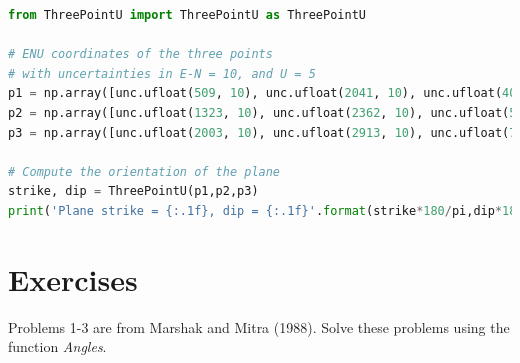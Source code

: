 \documentclass[a4paper , 12pt]{book}
\begin{document}
\begin{center}
\begin{lstlisting}[language=Python, frame=single]
from ThreePointU import ThreePointU as ThreePointU

# ENU coordinates of the three points
# with uncertainties in E-N = 10, and U = 5
p1 = np.array([unc.ufloat(509, 10), unc.ufloat(2041, 10), unc.ufloat(400, 5)])
p2 = np.array([unc.ufloat(1323, 10), unc.ufloat(2362, 10), unc.ufloat(500, 5)])
p3 = np.array([unc.ufloat(2003, 10), unc.ufloat(2913, 10), unc.ufloat(700, 5)])

# Compute the orientation of the plane
strike, dip = ThreePointU(p1,p2,p3)
print('Plane strike = {:.1f}, dip = {:.1f}'.format(strike*180/pi,dip*180/pi))
\end{lstlisting}
\end{center}

\section{Exercises} \label{exercises4}

Problems 1-3 are from Marshak and Mitra (1988). Solve these problems using the function \textit{Angles}.
\end{document}
